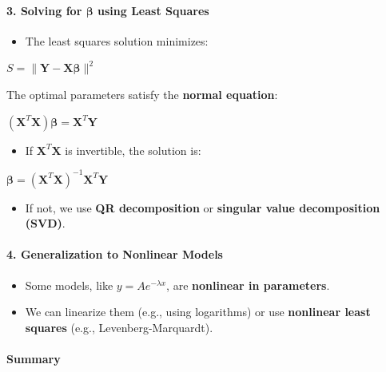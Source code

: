 \documentclass[11pt]{article}
\providecommand{\tightlist}{%
      \setlength{\itemsep}{0pt}\setlength{\parskip}{0pt}}
\begin{document}
\paragraph{\texorpdfstring{\textbf{3. Solving for \(\boldsymbol{\beta}\)
using Least
Squares}}{3. Solving for \textbackslash boldsymbol\{\textbackslash beta\} using Least Squares}}\label{solving-for-boldsymbolbeta-using-least-squares}

\begin{itemize}
\tightlist
\item
  The least squares solution minimizes:
\end{itemize}

\(S = \| \mathbf{Y} - \mathbf{X} \boldsymbol{\beta} \|^2\)

The optimal parameters satisfy the \textbf{normal equation}:

\((\mathbf{X}^T \mathbf{X}) \boldsymbol{\beta} = \mathbf{X}^T \mathbf{Y}\)

\begin{itemize}
\tightlist
\item
  If \(\mathbf{X}^T \mathbf{X}\) is invertible, the solution is:
\end{itemize}

\(\boldsymbol{\beta} = (\mathbf{X}^T \mathbf{X})^{-1} \mathbf{X}^T \mathbf{Y}\)

\begin{itemize}
\tightlist
\item
  If not, we use \textbf{QR decomposition} or \textbf{singular value
  decomposition (SVD)}.
\end{itemize}

\paragraph{\texorpdfstring{\textbf{4. Generalization to Nonlinear
Models}}{4. Generalization to Nonlinear Models}}\label{generalization-to-nonlinear-models}

\begin{itemize}
\tightlist
\item
  Some models, like \(y = A e^{-\lambda x}\), are \textbf{nonlinear in
  parameters}.
\item
  We can linearize them (e.g., using logarithms) or use
  \textbf{nonlinear least squares} (e.g., Levenberg-Marquardt).
\end{itemize}

\paragraph{\texorpdfstring{\textbf{Summary}}{Summary}}\label{summary}
\end{document}
